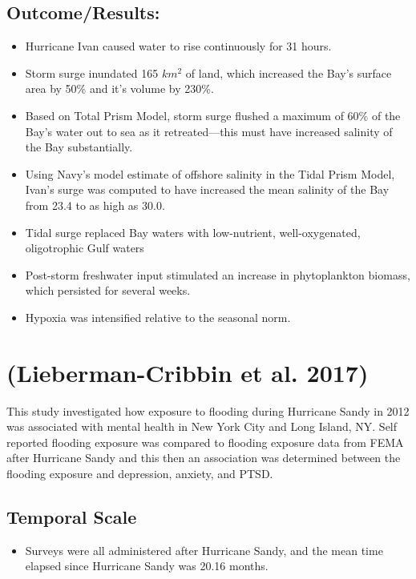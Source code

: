 \documentclass[
]{article}
\providecommand{\tightlist}{%
  \setlength{\itemsep}{0pt}\setlength{\parskip}{0pt}}
\begin{document}
\hypertarget{outcomeresults}{%
\subsection{Outcome/Results:}\label{outcomeresults}}

\begin{itemize}
\tightlist
\item
  Hurricane Ivan caused water to rise continuously for 31 hours.
\item
  Storm surge inundated 165 \(km^2\) of land, which increased the Bay's
  surface area by 50\% and it's volume by 230\%.
\item
  Based on Total Prism Model, storm surge flushed a maximum of 60\% of
  the Bay's water out to sea as it retreated---this must have increased
  salinity of the Bay substantially.
\item
  Using Navy's model estimate of offshore salinity in the Tidal Prism
  Model, Ivan's surge was computed to have increased the mean salinity
  of the Bay from 23.4 to as high as 30.0.
\item
  Tidal surge replaced Bay waters with low-nutrient, well-oxygenated,
  oligotrophic Gulf waters
\item
  Post-storm freshwater input stimulated an increase in phytoplankton
  biomass, which persisted for several weeks.
\item
  Hypoxia was intensified relative to the seasonal norm.
\end{itemize}

\hypertarget{lieberman2017self}{%
\section{(Lieberman-Cribbin et al. 2017)}\label{lieberman2017self}}

This study investigated how exposure to flooding during Hurricane Sandy
in 2012 was associated with mental health in New York City and Long
Island, NY. Self reported flooding exposure was compared to flooding
exposure data from FEMA after Hurricane Sandy and this then an
association was determined between the flooding exposure and depression,
anxiety, and PTSD.

\hypertarget{temporal-scale-3}{%
\subsection{Temporal Scale}\label{temporal-scale-3}}

\begin{itemize}
\tightlist
\item
  Surveys were all administered after Hurricane Sandy, and the mean time
  elapsed since Hurricane Sandy was 20.16 months.
\end{itemize}
\end{document}
